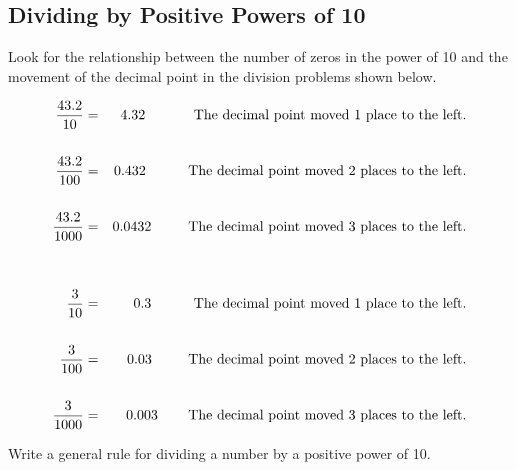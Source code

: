 \documentclass{ximera}
\begin{document}
\subsection*{Dividing by Positive Powers of 10}

Look for the relationship between the number of zeros in the power of 10 and the movement of the decimal point in the division problems shown below.

\begin{eqnarray*}
\frac{43.2}{10} &=&  4.32 \hspace{0.48in} \textrm{The decimal point moved 1 place to the left.} \\
& & \\
\frac{43.2}{100} &=& 0.432 \hspace{0.42in}  \textrm{The decimal point moved 2 places to the left.} \\
& & \\
\frac{43.2}{1000} &=& 0.0432 \hspace{0.365in}  \textrm{The decimal point moved 3 places to the left.} \\
& & \\
& & \\
\frac{3}{10} &=& 0.3 \hspace{0.42in} \textrm{The decimal point moved 1 place to the left.} \\
& & \\
\frac{3}{100} &=& 0.03 \hspace{0.36in} \textrm{The decimal point moved 2 places to the left.} \\
& & \\
\frac{3}{1000} &=& 0.003 \hspace{0.3in} \textrm{The decimal point moved 3 places to the left.} \\
\end{eqnarray*}

\begin{problem} Write a general rule for dividing a number by a positive power of 10.

\begin{multipleChoice}
  \end{multipleChoice}

\end{problem}
\end{document}

